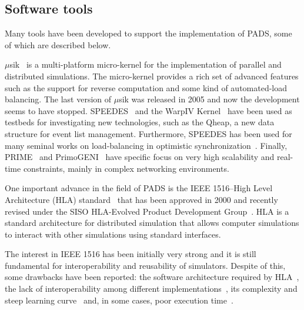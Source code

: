 \documentclass[1p]{elsarticle}
\begin{document}
\subsection{Software tools}

Many tools have been developed to support the implementation of PADS,
some of which are described below.

$\mu$sik~\cite{Perumalla:2005:MPS:1069810.1070161} is a multi-platform
micro-kernel for the implementation of parallel and distributed
simulations. The micro-kernel provides a rich set of advanced features
such as the support for reverse computation and some kind of
automated-load balancing. The last version of $\mu$sik was released in
2005 and now the development seems to have stopped.
SPEEDES~\cite{Steinman:2003:SPF:824475.825880} and the WarpIV
Kernel~\cite{Steinman_08s-siw-025warpiv} have been used as testbeds
for investigating new technologies, such as the Qheap, a new data
structure for event list management. Furthermore, SPEEDES has been
used for many seminal works on load-balancing in optimistic
synchronization~\cite{Wilson:1998:ELM:293172.293267,Wilson:1995:ALB:224401.224691}. Finally,
PRIME~\cite{prime} and PrimoGENI~\cite{5936747} have specific focus on
very high scalability and real-time constraints, mainly in complex
networking environments.

One important advance in the field of PADS is the IEEE 1516--High
Level Architecture (HLA) standard~\cite{ieee1516} that has been
approved in 2000 and recently revised under the SISO HLA-Evolved
Product Development Group~\cite{hla-evolved}. HLA is a standard
architecture for distributed simulation that allows computer
simulations to interact with other simulations using standard
interfaces.

The interest in IEEE 1516 has been initially very strong and it is
still fundamental for interoperability and reusability of simulators.
Despite of this, some drawbacks have been reported: the software 
architecture required by HLA~\cite{Davis:1999:HLA:324898.325337},
the lack of interoperability among different 
implementations~\cite{hlainteroperability}, its complexity and steep
learning curve~\cite{4736178} and, in some cases, poor execution
time~\cite{caihlaperformance}.
\end{document}
